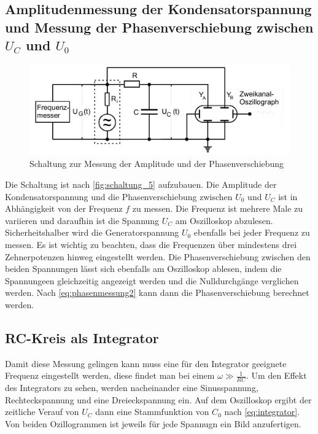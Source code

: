 \subsection{Amplitudenmessung der Kondensatorspannung und Messung der Phasenverschiebung zwischen $U_C$ und $U_0$}

\begin{figure}
    \centering
    \includegraphics[width=\textwidth/2]{images/schaltung_5.png}
    \caption{Schaltung zur Messung der Amplitude und der Phasenverschiebung  \cite{V353}}
    \label{fig:schaltung_5}
\end{figure}

Die Schaltung ist nach \autoref{fig:schaltung_5} aufzubauen. Die Amplitude der Kondensatorspannung und die Phasenverschiebung zwischen $U_0$ und $U_C$ ist in Abhängigkeit von der Frequenz $f$ zu messen. Die Frequenz ist mehrere Male zu variieren und daraufhin ist die Spannung $U_C$ am Oszilloskop abzulesen. Sicherheitshalber wird die Generatorspannung $U_0$ ebenfalls bei jeder Frequenz zu messen. Es ist wichtig zu beachten, dass die Frequenzen über mindestens drei Zehnerpotenzen hinweg eingestellt werden. 
Die Phasenverschiebung zwischen den beiden Spannungen lässt sich ebenfalls am Oszilloskop ablesen, indem die Spannungeen gleichzeitig angezeigt werden und die Nulldurchgänge verglichen werden.
Nach \autoref{eq:phasenmessung2} kann dann die Phasenverschiebung berechnet werden. 

\subsection{RC-Kreis als Integrator}

Damit diese Messung gelingen kann muss eine für den Integrator geeignete Frequenz eingestellt werden, diese findet man bei einem $\omega \gg \frac{1}{RC}$. Um den Effekt des Integrators zu sehen, werden nacheinander eine Sinusspannung, Rechteckspannung und eine Dreieckspannung ein. Auf dem Oszilloskop ergibt der zeitliche Verauf von $U_C$ dann eine Stammfunktion von $C_0$ nach \autoref{eq:integrator}. Von beiden Ozillogrammen ist jeweils für jede Spannugn ein Bild anzufertigen.

